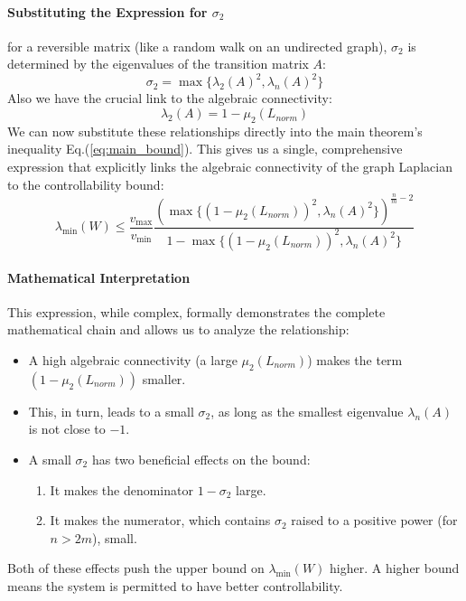 \documentclass[11pt, a4paper]{article}
\begin{document}
\paragraph{Substituting the Expression for $\sigma_2$}
for a reversible matrix (like a random walk on an undirected graph), $\sigma_2$ is determined by the eigenvalues of the transition matrix $A$:
\begin{equation}
    \sigma_2 = \max\{\lambda_2(A)^2, \lambda_n(A)^2\}
\end{equation}
Also we have the crucial link to the algebraic connectivity:
\begin{equation}
    \lambda_2(A) = 1 - \mu_2(L_{norm})
\end{equation}
We can now substitute these relationships directly into the main theorem's inequality Eq.(\ref{eq:main_bound}). This gives us a single, comprehensive expression that explicitly links the algebraic connectivity of the graph Laplacian to the controllability bound:
\begin{equation}
    \lambda_{\min}(W) \le \frac{v_{\max}}{v_{\min}} \frac{ \left( \max\{(1-\mu_2(L_{norm}))^2, \lambda_n(A)^2\} \right)^{\frac{n}{m}-2} }{ 1 - \max\{(1-\mu_2(L_{norm}))^2, \lambda_n(A)^2\} }
\end{equation}
\paragraph{Mathematical Interpretation}
This expression, while complex, formally demonstrates the complete mathematical chain and allows us to analyze the relationship:
\begin{itemize}
    \item A high algebraic connectivity (a large $\mu_2(L_{norm})$) makes the term $(1-\mu_2(L_{norm}))$ smaller.
    \item This, in turn, leads to a small $\sigma_2$, as long as the smallest eigenvalue $\lambda_n(A)$ is not close to $-1$.
    \item A small $\sigma_2$ has two beneficial effects on the bound:
    \begin{enumerate}
        \item It makes the denominator $1-\sigma_2$ large.
        \item It makes the numerator, which contains $\sigma_2$ raised to a positive power (for $n>2m$), small.
    \end{enumerate}
\end{itemize}
Both of these effects push the upper bound on $\lambda_{\min}(W)$ higher. A higher bound means the system is permitted to have better controllability.
\end{document}

